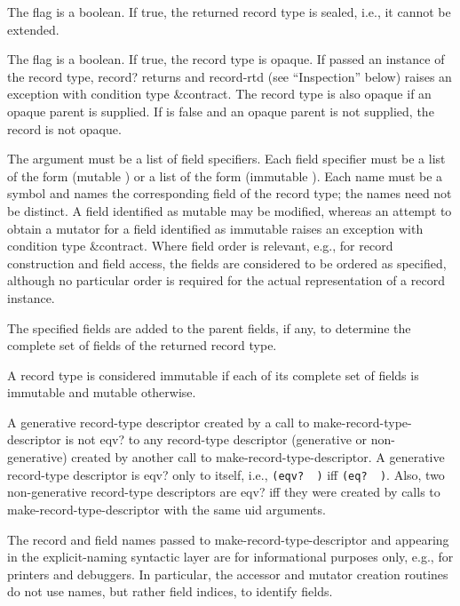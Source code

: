 \begin{entry}{%
}
The  flag is a boolean. If true, the returned record type
is sealed, i.e., it cannot be extended.

The  flag is a boolean. If true, the record type
is opaque.
If passed an instance of the record type,
{\cf record?} returns
\schfalse{} and {\cf record-rtd} (see ``Inspection'' below) raises
an exception with condition type {\cf\&contract}.
The record type is also opaque if an opaque parent is
supplied.  If  is false and an opaque parent is not
supplied, the record is not opaque.

The  argument must be a list of field specifiers. Each
field specifier must be a list of the form {\cf (mutable )}
or a list of the form {\cf (immutable )}.
Each name must be a symbol and names the corresponding field of the record
type; the names need not be distinct.  A field identified as mutable may
be modified, whereas an attempt to obtain a mutator for a field identified
as immutable raises an exception with condition type {\cf\&contract}.
Where field order is relevant, e.g., for record construction and field
access, the fields are considered to be ordered as specified, although
no particular order is required for the actual representation of a
record instance.

The specified fields are added to the parent fields, if any, to determine
the complete set of fields of the returned record type.

A record type is considered immutable if each of its complete set of
fields is immutable and mutable otherwise.

A generative record-type descriptor created by a call to {\cf
  make-record-type-descriptor} is not {\cf eqv?} to any record-type
descriptor (generative or non-generative) created by another call to
{\cf make-record-type-descriptor}. A generative record-type descriptor
is {\cf eqv?}  only to itself, i.e., {\tt (eqv?~ )} iff
{\tt (eq?~ )}.
Also, two non-generative record-type descriptors are {\cf eqv?} iff they were
created by calls to {\cf make-record-type-descriptor} with the same
uid arguments.

\begin{rationale}
  The record and field names passed to
  {\cf make-record-type-descriptor} and appearing in the explicit-naming
  syntactic layer are for informational purposes only, e.g., for
  printers and debuggers.
  In particular, the accessor and mutator creation routines do not use
  names, but rather field indices, to identify fields.
  

\end{rationale}
\end{entry}

